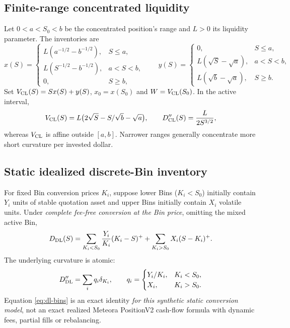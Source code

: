 \subsection{Finite-range concentrated liquidity}
Let $0<a<S_0<b$ be the concentrated position's range and $L>0$ its liquidity parameter. The inventories are
\begin{equation}
x(S)=\begin{cases}
L(a^{-1/2}-b^{-1/2}),&S\le a,\\
L(S^{-1/2}-b^{-1/2}),&a<S<b,\\
0,&S\ge b,
\end{cases}\qquad
y(S)=\begin{cases}
0,&S\le a,\\
L(\sqrt S-\sqrt a),&a<S<b,\\
L(\sqrt b-\sqrt a),&S\ge b.
\end{cases}
\label{eq:cl-inventory}
\end{equation}
Set $V_{\mathrm{CL}}(S)=Sx(S)+y(S)$, $x_0=x(S_0)$ and $W=V_{\mathrm{CL}}(S_0)$. In the active interval,
\begin{equation}
 V_{\mathrm{CL}}(S)=L\big(2\sqrt S-S/\sqrt b-\sqrt a\big),
 \qquad D_{\mathrm{CL}}''(S)=\frac{L}{2S^{3/2}},
\label{eq:cl-value}
\end{equation}
whereas $V_{\mathrm{CL}}$ is affine outside $[a,b]$. Narrower ranges generally concentrate more short curvature per invested dollar.

\subsection{Static idealized discrete-Bin inventory}
For fixed Bin conversion prices $K_i$, suppose lower Bins ($K_i<S_0$) initially contain $Y_i$ units of stable quotation asset and upper Bins initially contain $X_i$ volatile units. Under \emph{complete fee-free conversion at the Bin price}, omitting the mixed active Bin,
\begin{equation}
D_{\mathrm{DL}}(S)=
\sum_{K_i<S_0}\frac{Y_i}{K_i}(K_i-S)^+
+\sum_{K_i>S_0}X_i(S-K_i)^+.
\label{eq:dl-bins}
\end{equation}
The underlying curvature is atomic:
\begin{equation}
 D_{\mathrm{DL}}''=\sum_i q_i\delta_{K_i},\qquad
 q_i=\begin{cases}Y_i/K_i,&K_i<S_0,\\X_i,&K_i>S_0.\end{cases}
\label{eq:dl-atoms}
\end{equation}
Equation \eqref{eq:dl-bins} is an exact identity \emph{for this synthetic static conversion model}, not an exact realized Meteora PositionV2 cash-flow formula with dynamic fees, partial fills or rebalancing.


